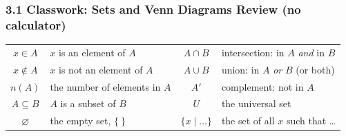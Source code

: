 \documentclass[12pt, twoside]{article}
\begin{document}
\subsubsection*{3.1 Classwork: Sets and Venn Diagrams Review (no calculator)}

\begin{center}
\small
\renewcommand{\arraystretch}{1.2}
\begin{tabular}{|c|l||c|l|}
\hline
$x \in A$ & $x$ is an element of $A$ & $A \cap B$ & intersection: in $A$ \emph{and} in $B$ \\
$x \notin A$ & $x$ is not an element of $A$ & $A \cup B$ & union: in $A$ \emph{or} $B$ (or both) \\
$n(A)$ & the number of elements in $A$ & $A'$ & complement: not in $A$ \\
$A \subseteq B$ & $A$ is a subset of $B$ & $U$ & the universal set \\
$\varnothing$ & the empty set, $\{\ \}$ & $\{x \mid \ldots\}$ & the set of all $x$ such that \ldots \\
\hline
\end{tabular}
\end{center}
\end{document}
